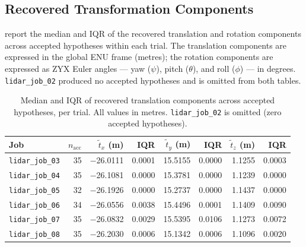 \subsection{Recovered Transformation Components}
\label{subsec:pa-results-transformation}

 report the median and IQR of the recovered translation and rotation components across accepted hypotheses within each trial. The translation components are expressed in the global ENU frame (metres); the rotation components are expressed as ZYX Euler angles --- yaw ($\psi$), pitch ($\theta$), and roll ($\phi$) --- in degrees. \texttt{lidar\_job\_02} produced no accepted hypotheses and is omitted from both tables.

\begin{table}[htbp]
  \centering
  \caption{Median and IQR of recovered translation components across accepted hypotheses, per trial. All values in metres. \texttt{lidar\_job\_02} is omitted (zero accepted hypotheses).}
  \label{tab:pa-results-translation}
  \begin{tabularx}{\textwidth}{l r r r r r r r}
    \toprule
    \textbf{Job} &
    \boldmath$n_\text{acc}$ &
    \boldmath$\tilde{t}_x$ \textbf{(m)} &
    \textbf{IQR} &
    \boldmath$\tilde{t}_y$ \textbf{(m)} &
    \textbf{IQR} &
    \boldmath$\tilde{t}_z$ \textbf{(m)} &
    \textbf{IQR} \\
    \midrule
    \texttt{lidar\_job\_03} & 35 & $-$26.0111 & 0.0001 & 15.5155 & 0.0000 & 1.1255 & 0.0003 \\
    \texttt{lidar\_job\_04} & 35 & $-$26.1081 & 0.0000 & 15.3781 & 0.0000 & 1.1239 & 0.0000 \\
    \texttt{lidar\_job\_05} & 32 & $-$26.1926 & 0.0000 & 15.2737 & 0.0000 & 1.1437 & 0.0000 \\
    \texttt{lidar\_job\_06} & 34 & $-$26.0556 & 0.0038 & 15.4496 & 0.0001 & 1.1409 & 0.0090 \\
    \texttt{lidar\_job\_07} & 35 & $-$26.0832 & 0.0029 & 15.5395 & 0.0106 & 1.1273 & 0.0072 \\
    \texttt{lidar\_job\_08} & 35 & $-$26.2030 & 0.0006 & 15.1342 & 0.0006 & 1.1096 & 0.0020 \\
    \bottomrule
  \end{tabularx}
\end{table}

